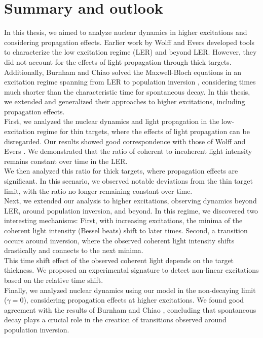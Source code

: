 \chapter{Summary and outlook}

In this thesis, we aimed to analyze nuclear dynamics in higher excitations and considering propagation effects. Earlier work by Wolff and Evers \cite{wolff2023characterization} developed tools to characterize the low excitation regime (LER) and beyond LER. However, they did not account for the effects of light propagation through thick targets. Additionally, Burnham and Chiao solved the Maxwell-Bloch equations in an excitation regime spanning from LER to population inversion \cite{BURNHAM1969}, considering times much shorter than the characteristic time for spontaneous decay. In this thesis, we extended and generalized their approaches to higher excitations, including propagation effects.\\

First, we analyzed the nuclear dynamics and light propagation in the low-excitation regime for thin targets, where the effects of light propagation can be disregarded. Our results showed good correspondence with those of Wolff and Evers \cite{wolff2023characterization}. We demonstrated that the ratio of coherent to incoherent light intensity remains constant over time in the LER.\\

We then analyzed this ratio for thick targets, where propagation effects are significant. In this scenario, we observed notable deviations from the thin target limit, with the ratio no longer remaining constant over time.\\

Next, we extended our analysis to higher excitations, observing dynamics beyond LER, around population inversion, and beyond. In this regime, we discovered two interesting mechanisms: First, with increasing excitations, the minima of the coherent light intensity (Bessel beats) shift to later times. Second, a transition occurs around inversion, where the observed coherent light intensity shifts drastically and connects to the next minima.\\

This time shift effect of the observed coherent light depends on the target thickness. We proposed an experimental signature to detect non-linear excitations based on the relative time shift.\\

Finally, we analyzed nuclear dynamics using our model in the non-decaying limit ($\gamma = 0$), considering propagation effects at higher excitations. We found good agreement with the results of Burnham and Chiao \cite{BURNHAM1969}, concluding that spontaneous decay plays a crucial role in the creation of transitions observed around population inversion.

